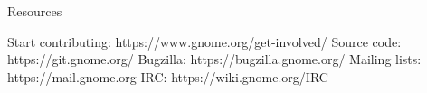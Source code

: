 \documentclass{beamer}
\begin{document}
\begin{frame}{Resources}
    
  \begin{thebibliography}{10}

    Start contributing:
    \newblock https://www.gnome.org/get-involved/
    Source code:
    \newblock https://git.gnome.org/
    Bugzilla:
    \newblock https://bugzilla.gnome.org/
    Mailing lists:
    \newblock https://mail.gnome.org
    IRC:
    \newblock https://wiki.gnome.org/IRC

  \end{thebibliography}
\end{frame}
\end{document}
